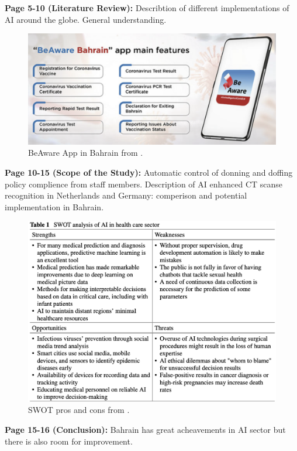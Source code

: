     \textbf{Page 5-10 (Literature Review):}
    Describtion of different implementations of AI around the globe. General understanding.
    \begin{figure}[H]
        \centering
        \includegraphics[width=1\textwidth]{figures/SR0023US23/fig1.png}
        \caption{BeAware App in Bahrain from \cite{x101}.}
        \label{fig1:SR0023US23}
    \end{figure}
    
    \textbf{Page 10-15 (Scope of the Study):}
    Automatic control of donning and doffing policy complience from staff members. Description of AI enhanced CT scanse recognition in Netherlands and Germany: comperison and potential implementation in Bahrain.
    \begin{figure}[H]
        \centering
        \includegraphics[width=1\textwidth]{figures/SR0023US23/fig3.png}
        \caption{SWOT pros and cons from \cite{x101}.}
        \label{fig3:SR0023US23}
    \end{figure}

    \textbf{Page 15-16 (Conclusion):}
    Bahrain has great acheavements in AI sector but there is also room for improvement.
    

